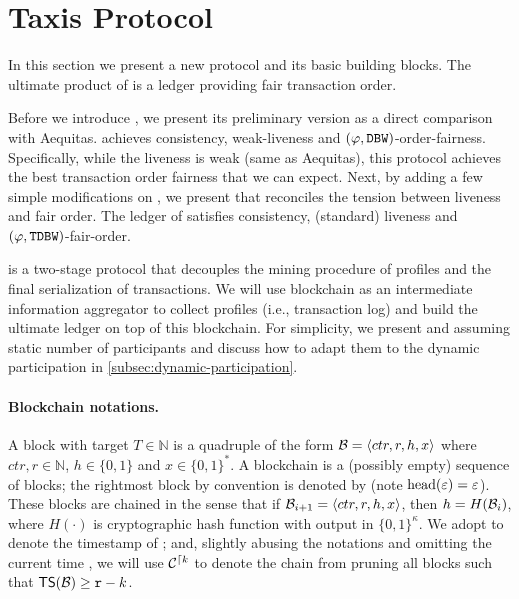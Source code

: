 \section{Taxis Protocol}
\label{sec:protocol}

In this section we present a new protocol \Taxis and its basic building blocks.
%
The ultimate product of \Taxis is a ledger \ledger providing fair transaction order.

Before we introduce \Taxis, we present its preliminary version \TaxisWL as a direct comparison with \textsf{Aequitas}.
%
\TaxisWL achieves consistency, weak-liveness and $(\varphi, \mathtt{DBW})$-order-fairness.
%
Specifically, while the liveness is weak (same as \textsf{Aequitas}), this protocol achieves the best transaction order fairness that we can expect.
%
Next, by adding a few simple modifications on \TaxisWL, we present \Taxis that reconciles the tension between liveness and fair order.
%
The ledger of \Taxis satisfies consistency, (standard) liveness and $(\varphi, \mathtt{TDBW})$-fair-order.

\Taxis is a two-stage protocol that decouples the mining procedure of profiles and the final serialization of transactions.
%
We will use blockchain as an intermediate information aggregator to collect profiles (i.e., transaction log) and build the ultimate ledger \ledger on top of this blockchain.
%
For simplicity, we present \TaxisWL and \Taxis assuming static number of participants and discuss how to adapt them to the dynamic participation in \cref{subsec:dynamic-participation}.

\paragraph{Blockchain notations.}
%
A block with target $T \in \mathbb{N}$ is a quadruple of the form $\mathcal{B} = \langle ctr, r, h, x \rangle$ where $ctr, r \in \mathbb{N}$, $h \in \{0, 1\}$ and $x \in \{0, 1\}^*$.
%
A blockchain \chain is a (possibly empty) sequence of blocks; the rightmost block by convention is denoted by \chainHead{\chain} (note $\mathrm{head}(\varepsilon) = \varepsilon$).
%
These blocks are chained in the sense that if $\mathcal{B}_{i + 1} = \langle ctr, r, h, x \rangle$, then $h = H(\mathcal{B}_i)$, where $H(\cdot)$ is cryptographic hash function with output in $\{0, 1\}^\kappa$.
%
We adopt \timestamp{\block} to denote the timestamp of \block; and, slightly abusing the notations and omitting the current time \round, we will use $\mathcal{C}^{\lceil k}$ to denote the chain from pruning all blocks \block such that $\mathsf{TS}(\mathcal{B}) \ge \mathtt{r} - k$.

